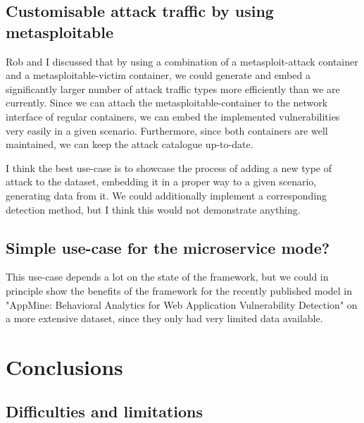 \documentclass{article}
\begin{document}

\subsection{Customisable attack traffic by using metasploitable}

Rob and I discussed that by using a combination of a metasploit-attack container and a metasploitable-victim container, we could generate and embed a significantly larger number of attack traffic types more efficiently than we are currently. Since we can attach the metasploitable-container to the network interface of regular containers, we can embed the implemented vulnerabilities very easily in a given scenario. Furthermore, since both containers are well maintained, we can keep the attack catalogue up-to-date.

I think the best use-case is to showcase the process of adding a new type of attack to the dataset, embedding it in a proper way to a given scenario, generating data from it. We could additionally implement a corresponding detection method, but I think this would not demonstrate anything. 


\subsection{Simple use-case for the microservice mode?}
This use-case depends a lot on the state of the framework, but we could in principle show the benefits of the framework for the recently published model in "AppMine: Behavioral Analytics for Web Application Vulnerability Detection" on a more extensive dataset, since they only had very limited data available. 
\section{Conclusions}\label{Sec:Conclusion}



\subsection{Difficulties and limitations}
\end{document}
